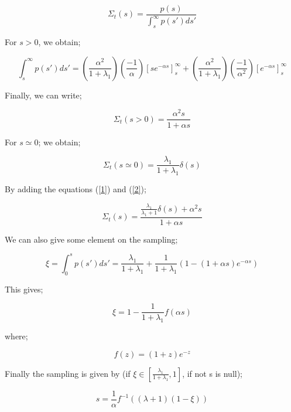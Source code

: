 \documentclass[preprint,12pt]{elsarticle}
\begin{document}
\begin{equation}
\Sigma_t(s) = \frac{p(s)}{\int_s^\infty p(s') ds'}
\end{equation}

For $s>0$, we obtain;

\begin{equation}
\int_s^\infty p(s')ds' = \left(\frac{\alpha^2}{1+\lambda_1}\right)\left(\frac{-1}{\alpha}\right)\left[se^{-\alpha s}\right]_s^\infty + \left(\frac{\alpha^2}{1+\lambda_1}\right)\left(\frac{-1}{\alpha^2}\right)\left[e^{-\alpha s}\right]_s^\infty 
\end{equation}

Finally, we can write;

\begin{equation}\label{1}
\Sigma_t(s>0) = \frac{\alpha^2s}{1+\alpha s}
\end{equation}

For $s \simeq 0$; we obtain;

\begin{equation}\label{2}
\Sigma_t(s\simeq 0) = \frac{\lambda_1}{1+\lambda_1}\delta(s)
\end{equation}

By adding the equations (\ref{1}) and (\ref{2});

\begin{equation}
\Sigma_t(s) = \frac{\frac{\lambda_1}{\lambda_1 + 1}\delta(s) + \alpha^2 s}{1+\alpha s}
\end{equation}

We can also give some element on the sampling;

\begin{equation}
\xi = \int_0^s p(s')ds' = \frac{\lambda_1}{1+\lambda_1} + \frac{1}{1+\lambda_1}\left(1-(1+\alpha s)e^{-\alpha s}\right)
\end{equation}

This gives;

\begin{equation}
\xi = 1 - \frac{1}{1+\lambda_1}f(\alpha s)
\end{equation}

where;

\begin{equation}
f(z) = (1+z)e^{-z}
\end{equation}

Finally the sampling is given by (if $\xi \in [\frac{\lambda_1}{1+\lambda_1},1]$, if not s is null);

\begin{equation}
s =\frac{1}{\alpha}f^{-1}((\lambda+1)(1-\xi)) 
\end{equation}
\end{document}
